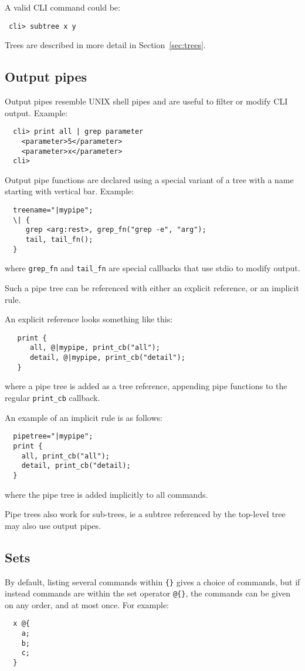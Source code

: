 \documentclass[a4paper, 10pt] {article}
\begin{document}
A valid CLI command could be:
\begin{verbatim}
 cli> subtree x y
\end{verbatim}

Trees are described in more detail in Section~\ref{sec:trees}.

\subsection{Output pipes}
\label{sec:pipes}

Output pipes resemble UNIX shell pipes and are useful to filter or modify CLI output. Example:
\begin{verbatim}
  cli> print all | grep parameter
    <parameter>5</parameter>
    <parameter>x</parameter>
  cli>
\end{verbatim}

Output pipe functions are declared using a special variant of a tree
with a name starting with vertical bar. Example:
\begin{verbatim}
  treename="|mypipe";
  \| { 
     grep <arg:rest>, grep_fn("grep -e", "arg");
     tail, tail_fn();
  }
\end{verbatim}
where {\tt grep\_fn} and {\tt tail\_fn} are special callbacks that use stdio to modify output.

Such a pipe tree can be referenced with either an explicit reference, or an implicit rule.

An explicit reference looks something like this:
\begin{verbatim}
   print {     
      all, @|mypipe, print_cb("all");
      detail, @|mypipe, print_cb("detail");
   }
\end{verbatim}
where a pipe tree is added as a tree reference, appending pipe functions to the regular {\tt print\_cb} callback.

An example of an implicit rule is as follows:
\begin{verbatim}
  pipetree="|mypipe";
  print {
    all, print_cb("all");
    detail, print_cb("detail);
  }
\end{verbatim}
where the pipe tree is added implicitly to all commands.

Pipe trees also work for sub-trees, ie a subtree referenced by the top-level tree may also use output pipes.

\subsection{Sets}
\label{sec:sets}
By default, listing several commands within {\tt \{\}} gives a choice of commands, but if instead commands are within the set operator {\tt @\{\}}, the commands can be given on any order, and at most once. For example:
\begin{verbatim}
  x @{
    a;
    b;
    c;
  }
\end{verbatim}
\end{document}
